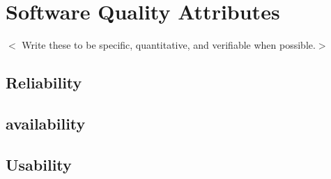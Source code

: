 \section{Software Quality Attributes}
$<$ Write these to be specific, quantitative, and verifiable when possible.$>$
\subsection {Reliability}
\subsection {availability}
\subsection {Usability}


